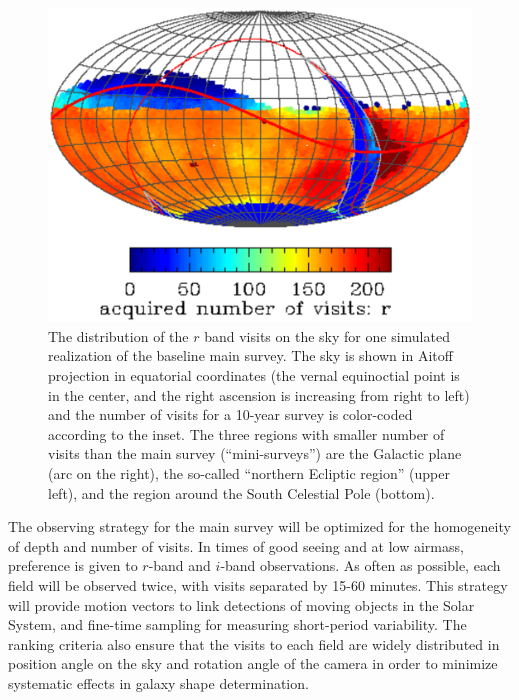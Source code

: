 \documentclass{emulateapj}
\begin{document}
\begin{figure}
\vskip -1.0in
\includegraphics[width=1.0\hsize,clip]{rBandWhite.ps}
\vskip -1.0in
\caption{The distribution of the $r$ band visits on the sky for one simulated 
realization of the baseline main survey. The sky is shown in Aitoff projection 
in equatorial coordinates (the vernal equinoctial point is in the center, and 
the right ascension is increasing from right to left) and the number of visits for 
a 10-year survey is color-coded according to the inset. The three regions with 
smaller number of visits than the main survey (``mini-surveys'') are the Galactic 
plane (arc on the right), the so-called ``northern Ecliptic region'' (upper left), and
the region around the South Celestial Pole (bottom).} 
\label{Fig:rbandSky}
\end{figure}

The observing strategy for the main survey will be optimized for the homogeneity
of depth and number of visits. In times of good seeing and at low airmass, preference 
is given to $r$-band and $i$-band observations. As often as possible, each field will be 
observed twice, with visits separated by 15-60 minutes. This strategy will provide motion 
vectors to link detections of moving objects in the Solar System, and fine-time sampling 
for measuring short-period variability. The ranking criteria also ensure that the 
visits to each field are widely distributed in position angle on the sky and 
rotation angle of the camera in order to minimize systematic effects in galaxy shape 
determination.
\end{document}
